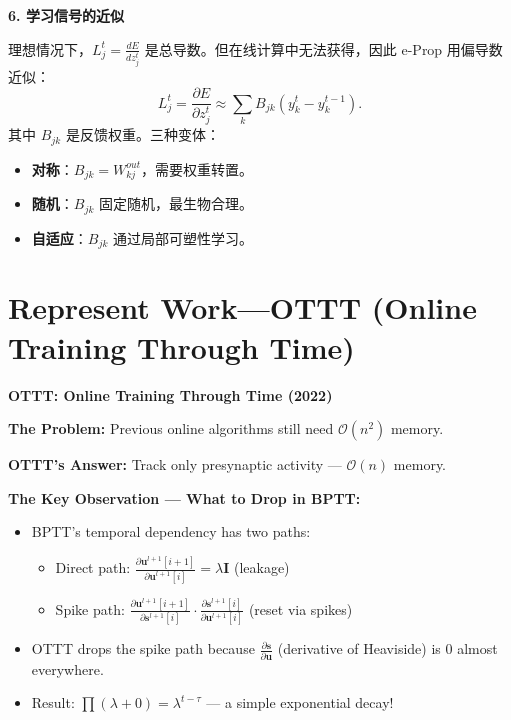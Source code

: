 \documentclass[journal,12pt,onecolumn]{IEEEtran}
\begin{document}
\medskip\noindent\textbf{6. 学习信号的近似}

理想情况下，$L_j^t = \frac{dE}{dz_j^t}$ 是总导数。但在线计算中无法获得，因此 e-Prop 用偏导数近似：
\[
L_j^t = \frac{\partial E}{\partial z_j^t} \approx \sum_k B_{jk} (y_k^t - y_k^{t-1}). \tag{4}
\]
其中 $B_{jk}$ 是反馈权重。三种变体：
\begin{itemize}
    \item \textbf{对称}：$B_{jk} = W_{kj}^{out}$，需要权重转置。
    \item \textbf{随机}：$B_{jk}$ 固定随机，最生物合理。
    \item \textbf{自适应}：$B_{jk}$ 通过局部可塑性学习。
\end{itemize}


\section{Represent Work—OTTT (Online Training Through Time)}

\bigskip\noindent\textbf{OTTT: Online Training Through Time (2022)}\par\smallskip

\textbf{The Problem:} Previous online algorithms still need $\mathcal{O}(n^2)$ memory.

\textbf{OTTT's Answer:} Track only presynaptic activity — $\mathcal{O}(n)$ memory.

\textbf{The Key Observation — What to Drop in BPTT:}
\begin{itemize}
    \item BPTT's temporal dependency has two paths:
        \begin{itemize}
            \item Direct path: $\frac{\partial \mathbf{u}^{l+1}[i+1]}{\partial \mathbf{u}^{l+1}[i]} = \lambda \mathbf{I}$ (leakage)
            \item Spike path: $\frac{\partial \mathbf{u}^{l+1}[i+1]}{\partial \mathbf{s}^{l+1}[i]} \cdot \frac{\partial \mathbf{s}^{l+1}[i]}{\partial \mathbf{u}^{l+1}[i]}$ (reset via spikes)
        \end{itemize}
    \item OTTT drops the spike path because $\frac{\partial \mathbf{s}}{\partial \mathbf{u}}$ (derivative of Heaviside) is 0 almost everywhere.
    \item Result: $\prod (\lambda + 0) = \lambda^{t-\tau}$ — a simple exponential decay!
\end{itemize}
\end{document}
